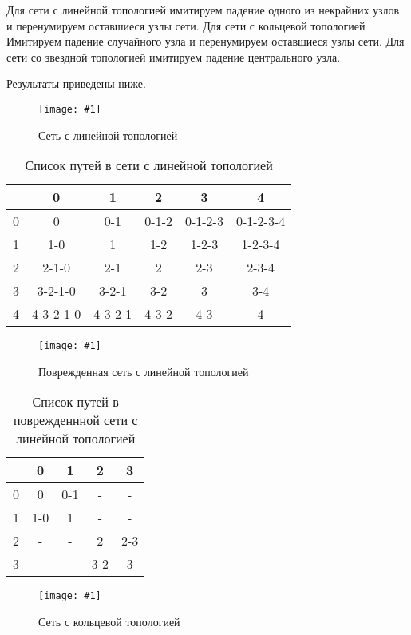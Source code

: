 \documentclass[a4paper,12pt]{article}
\newcommand{\plot}[3]{
    \begin{figure}[H]
        \begin{center}
            \texttt{[image: \#1]}
            \caption{#2}
            \label{#3}
        \end{center}
    \end{figure}
}
\begin{document}
    Для сети с линейной топологией имитируем падение одного из некрайних узлов и перенумируем оставшиеся узлы сети. Для сети с кольцевой топологией Имитируем падение случайного узла и перенумируем оставшиеся узлы сети. Для сети со звездной топологией имитируем падение центрального узла.

    Результаты приведены ниже.

    \plot{img/TopologyLine.png}{Сеть с линейной топологией}{p:tl}

    \begin{table}[H]
    \caption{Список путей в сети с линейной топологией}
        \begin{tabular}{| c | c | c | c | c | c |}
            \hline
             & 0 & 1 & 2 & 3 & 4 \\
            \hline
            0 & 0 & 0-1 & 0-1-2 & 0-1-2-3 & 0-1-2-3-4 \\
            \hline
            1 & 1-0 & 1 & 1-2 & 1-2-3 & 1-2-3-4 \\
            \hline
            2 & 2-1-0 & 2-1 & 2 & 2-3 & 2-3-4 \\
            \hline
            3 & 3-2-1-0 & 3-2-1 & 3-2 & 3 & 3-4 \\
            \hline
            4 & 4-3-2-1-0 & 4-3-2-1 & 4-3-2 & 4-3 & 4\\
            \hline
        \end{tabular}
        \centering
    \end{table}
    
    \plot{img/TopologyLine corrupted.png}{Поврежденная сеть с линейной топологией}{p:tl_c}

    \begin{table}[H]
    \caption{Список путей в поврежденнной сети с линейной топологией}
        \begin{tabular}{| c | c | c | c | c |}
            \hline
             & 0 & 1 & 2 & 3 \\
            \hline
            0 & 0 & 0-1 & - & - \\
            \hline
            1 & 1-0 & 1 & - & - \\
            \hline
            2 & - & - & 2 & 2-3 \\
            \hline
            3 & - & - & 3-2 & 3 \\
            \hline
        \end{tabular}
        \centering
    \end{table}

    \plot{img/TopologyRing.png}{Сеть с кольцевой топологией}{p:rl}
\end{document}
